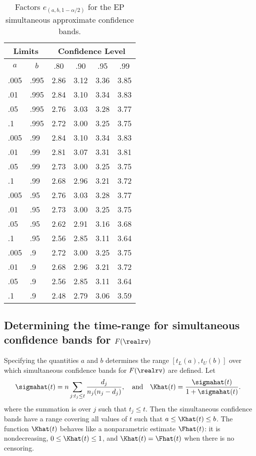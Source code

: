 \begin{table}
\caption{Factors $e_{(a,b,1-\alpha/2)}$
for the EP simultaneous approximate confidence bands.}
\centering\small
\begin{tabular}{llrrrr}
\\[-.5ex]
\hline
\multicolumn{2}{c}{Limits} & \multicolumn{4}{c}{Confidence Level}\\
\hline
\multicolumn{1}{c}{$a$}&\multicolumn{1}{c}{$b$}
&\multicolumn{1}{c}{.80}
&\multicolumn{1}{c}{.90}
&\multicolumn{1}{c}{.95}
&\multicolumn{1}{c}{.99}\\
\hline
.005&.995&2.86&3.12&3.36&3.85\\
.01&.995&2.84&3.10&3.34&3.83\\
.05&.995&2.76&3.03&3.28&3.77\\
.1&.995&2.72&3.00&3.25&3.75\\
.005&.99&2.84&3.10&3.34&3.83\\
.01&.99&2.81&3.07&3.31&3.81\\
.05&.99&2.73&3.00&3.25&3.75\\
.1&.99&2.68&2.96&3.21&3.72\\
.005&.95&2.76&3.03&3.28&3.77\\
.01&.95&2.73&3.00&3.25&3.75\\
.05&.95&2.62&2.91&3.16&3.68\\
.1&.95&2.56&2.85&3.11&3.64\\
.005&.9&2.72&3.00&3.25&3.75\\
.01&.9&2.68&2.96&3.21&3.72\\
.05&.9&2.56&2.85&3.11&3.64\\
.1&.9&2.48&2.79&3.06&3.59\\
\hline
\end{tabular}
\label{table:vijay.evalues}
\end{table}
\subsection{Determining the time-range for simultaneous confidence 
bands for $F(\realrv)$} 
\label{section:simultaneous.a.b}
Specifying the quantities $a$ and $b$
determines the range $[t_{L}(a),t_{U}(b)]$ over which simultaneous
confidence bands for $F(\realrv)$ are defined. Let
\begin{displaymath}
\sigmahat(t) = n \sum_{j: t_{j} \leq t} \frac{d_{j}}{n_{j}(n_{j}-d_{j})},\quad
\mbox{and} \quad \Khat(t)=\frac{\sigmahat(t)}{1+\sigmahat(t)}.
\end{displaymath}
where the summation is over $j$ such that $t_{j}\leq t$.
Then the simultaneous confidence bands have a range covering all values
of $t$ such that $a \leq \Khat(t) \leq b$. The function $\Khat(t)$
behaves like a nonparametric estimate $\Fhat(t)$: it is nondecreasing,
$0 \leq \Khat(t) \leq 1$, and $\Khat(t)=\Fhat(t)$ when there is no
censoring.

